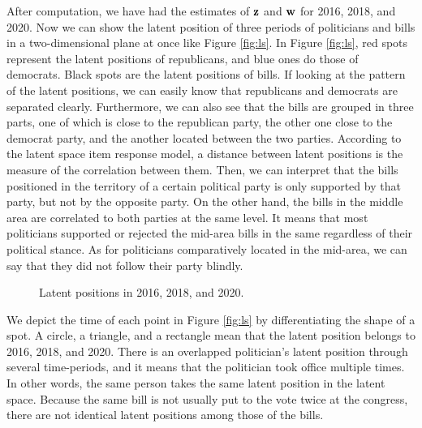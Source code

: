 \documentclass[a4paper, 11pt]{report}
\begin{document}
\begin{itemize}
\quad After computation, we have had the estimates of $\bf{z}$ and $\bf{w}$ for 2016, 2018, and 2020. Now we can show the latent position of three periods of politicians and bills in a two-dimensional plane at once like Figure \ref{fig:ls}. In Figure \ref{fig:ls}, red spots represent the latent positions of republicans, and blue ones do those of democrats. Black spots are the latent positions of bills. If looking at the pattern of the latent positions,
we can easily know that republicans and democrats are separated clearly. Furthermore, we can also see that the bills are grouped in three parts, one of which is close to the republican party, the other one close to the democrat party, and the another located between the two parties. According to the latent space item response model, a distance between latent positions is the measure of the correlation between them. Then, we can interpret that the bills positioned in the territory of a certain political party is only supported by that party, but not by the opposite party. On the other hand, the bills in the middle area are correlated to both parties at the same level. It means that most politicians supported or rejected the mid-area bills in the same regardless of their political stance. As for politicians comparatively located in the mid-area, we can say that they did not follow their party blindly.

\begin{figure}
  \begin{center}
  \end{center}
  \caption{Latent positions in 2016, 2018, and 2020. }
  \label{fig:annual}
\end{figure}

\quad We depict the time of each point in Figure \ref{fig:ls} by differentiating the shape of a spot. A circle, a triangle, and a rectangle mean that the latent position belongs to 2016, 2018, and 2020. There is an overlapped politician's latent position through several time-periods, and it means that the politician took office multiple times. In other words, the same person takes the same latent position in the latent space. Because the same bill is not usually put to the vote twice at the congress, there are not identical latent positions among those of the bills.


\end{itemize}
\end{document}
